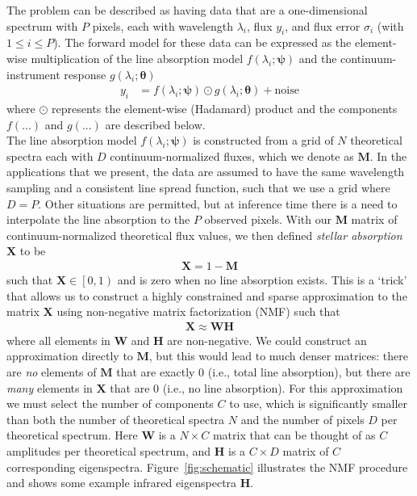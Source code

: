 \documentclass[modern]{aastex631}
\renewcommand{\vec}[1]{\mathbf{#1}}
\newcommand{\vectheta}{\boldsymbol{\theta}}
\newcommand{\vecpsi}{\boldsymbol{\psi}}
\newcommand{\vecX}{\mathbf{X}}
\newcommand{\hadamard}{\odot}
\begin{document}
The problem can be described as having data that are a one-dimensional spectrum with $P$ pixels, each with wavelength $\lambda_i$, flux $y_i$, and flux error $\sigma_i$ (with $1 \leq i \leq P$). The forward model for these data can be expressed as the element-wise multiplication of the line absorption model $f(\lambda_i; \vecpsi)$ and the continuum-instrument response $g(\lambda_i;\vectheta)$
\begin{align}
    y_i &= f(\lambda_i;\vecpsi)\hadamard{}g(\lambda_i;\vectheta) + \mbox{noise}
\end{align}
where $\hadamard$ represents the element-wise (Hadamard) product and the components $f(...)$ and $g(...)$ are described below.\\


The line absorption model $f(\lambda_i;\vecpsi)$ is constructed from a grid of $N$ theoretical spectra each with $D$  continuum-normalized fluxes, which we denote as $\vec{M}$. In the applications that we present, the data are assumed to have the same wavelength sampling and a consistent line spread function, such that we use a grid where $D = P$. Other situations are permitted, but at inference time there is a need to interpolate the line absorption to the $P$ observed pixels. With our $\vec{M}$ matrix of continuum-normalized theoretical flux values, we then defined \emph{stellar absorption} $\vecX$ to be
\begin{align}
    \vecX = 1 - \vec{M}
\end{align}
such that $\vecX \in \left[0, 1\right)$ and is zero when no line absorption exists. This is a `trick' that allows us to construct a highly constrained and sparse approximation to the matrix $\vecX$ using non-negative matrix factorization (NMF) such that 
\begin{align}
    \vecX \approx \vec{W}\vec{H} \label{eq:nmf}
\end{align}
where all elements in $\vec{W}$ and $\vec{H}$ are non-negative. 
We could construct an approximation directly to $\vec{M}$, but this would lead to much denser matrices: there are \emph{no} elements of $\vec{M}$ that are exactly 0 (i.e., total line absorption), but there are \emph{many} elements in $\vecX$ that are 0 (i.e., no line absorption). For this approximation we must select the number of components $C$ to use, which is significantly smaller than both the number of theoretical spectra $N$ and the number of pixels $D$ per theoretical spectrum. Here $\vec{W}$ is a $N \times C$ matrix that can be thought of as $C$ amplitudes per theoretical spectrum, and $\vec{H}$ is a $C \times D$ matrix of $C$ corresponding eigenspectra. Figure~\ref{fig:schematic} illustrates the NMF procedure and shows some example infrared eigenspectra $\vec{H}$. \\
\end{document}
